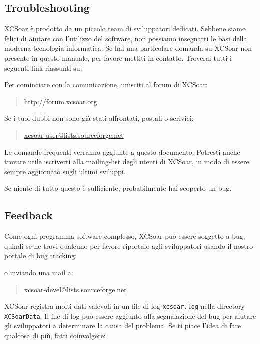 \subsection*{Troubleshooting}
XCSoar è prodotto da un piccolo team di sviluppatori dedicati. Sebbene siamo
felici di aiutare con l'utilizzo del software, non possiamo insegnarti le basi 
della moderna tecnologia informatica. Se hai una particolare domanda su XCSoar 
non presente in questo manuale, per favore mettiti in contatto.
Troverai tutti i seguenti link riassunti su:
\begin{quote}
\end{quote}
Per cominciare con la comunicazione, unisciti al forum di XCSoar:
\begin{quote}
\url{http://forum.xcsoar.org}
\end{quote}
Se i tuoi dubbi non sono già stati affrontati, postali o scrivici: 
\begin{quote}
\href{mailto:xcsoar-user@lists.sourceforge.net}{xcsoar-user@lists.sourceforge.net}
\end{quote}
Le domande frequenti verranno aggiunte a questo documento.
Potresti anche trovare utile iscriverti alla mailing-list degli utenti di XCSoar,
in modo di essere sempre aggiornato sugli ultimi sviluppi.

Se niente di tutto questo è sufficiente, probabilmente hai scoperto un bug.

\subsection*{Feedback}
Come ogni programma software complesso, XCSoar può essere soggetto a
bug, quindi se ne trovi qualcuno per favore riportalo agli sviluppatori
usando il nostro portale di bug tracking: 
\begin{quote}
\end{quote}
o inviando una mail a:
\begin{quote}
\href{mailto:xcsoar-devel@lists.sourceforge.net}{xcsoar-devel@lists.sourceforge.net}
\end{quote}
XCSoar registra molti dati valevoli in un file di log
\verb|xcsoar.log| nella directory \texttt{XCSoarData}. Il file di log può essere aggiunto alla segnalazione del bug per aiutare gli sviluppatori a determinare la causa del problema.
Se ti piace l'idea di fare qualcosa di più, fatti coinvolgere:
\begin{quote}
\end{quote}

